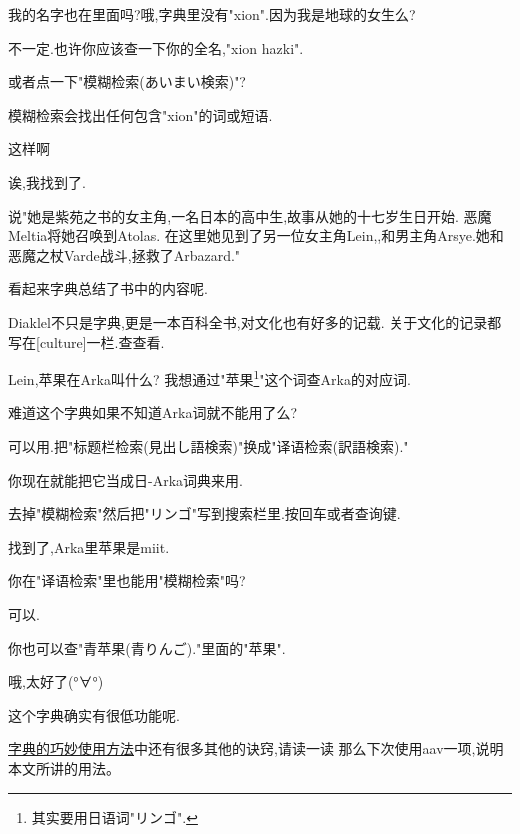 我的名字也在里面吗?哦,字典里没有"xion".因为我是地球的女生么?


不一定.也许你应该查一下你的全名,"xion hazki".

或者点一下"模糊检索(あいまい検索)"?

模糊检索会找出任何包含"xion"的词或短语.


这样啊

诶,我找到了.

说"她是紫苑之书的女主角,一名日本的高中生,故事从她的十七岁生日开始. 恶魔Meltia将她召唤到Atolas.
在这里她见到了另一位女主角Lein,,和男主角Arsye.她和恶魔之杖Varde战斗,拯救了Arbazard."

看起来字典总结了书中的内容呢.


Diaklel不只是字典,更是一本百科全书,对文化也有好多的记载.
关于文化的记录都写在[culture]一栏.查查看.


Lein,苹果在Arka叫什么? 我想通过"苹果\footnote{其实要用日语词"リンゴ".}"这个词查Arka的对应词.

难道这个字典如果不知道Arka词就不能用了么?


可以用.把"标题栏检索(見出し語検索)"换成"译语检索(訳語検索)."

你现在就能把它当成日-Arka词典来用.

去掉"模糊检索"然后把"リンゴ"写到搜索栏里.按回车或者查询键.


找到了,Arka里苹果是miit.

你在"译语检索"里也能用"模糊检索"吗?

    

可以.

你也可以查"青苹果(青りんご)."里面的"苹果".


哦,太好了(°∀°)

这个字典确实有很低功能呢.


\href{http://conlinguistics.org/arka/study_yulf_140.html}{字典的巧妙使用方法}中还有很多其他的诀窍,请读一读
那么下次使用aav一项,说明本文所讲的用法。